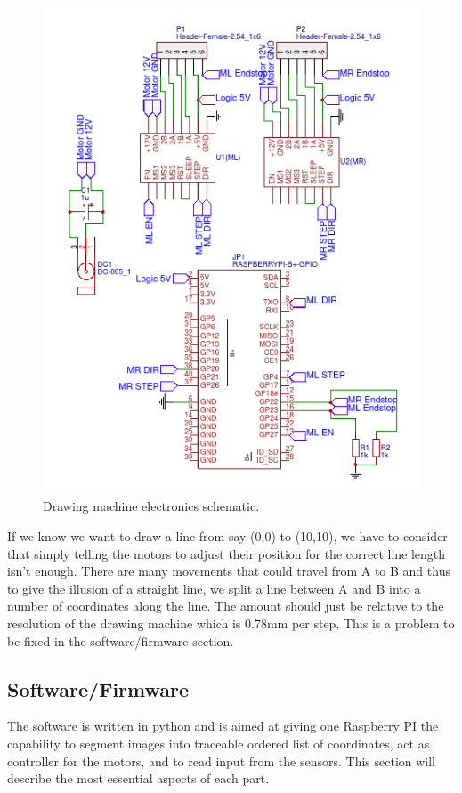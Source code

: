 \begin{figure}[h]
\centering
\includegraphics[scale=0.60]{Images/DrawingMachine/Schematic.png}
\caption{ Drawing machine electronics schematic. }
\label{DrawingMachineSchematic}
\end{figure}
 
If we know we want to draw a line from say (0,0) to (10,10), we have to consider that simply telling the motors to adjust their position for the correct line length isn't enough. There are many movements that could travel from A to B and thus to give the illusion of a straight line, we split a line between A and B into a number of coordinates along the line. The amount should just be relative to the resolution of the drawing machine which is 0.78mm per step. This is a problem to be fixed in the software/firmware section.

\subsection{Software/Firmware}
The software is written in python and is aimed at giving one Raspberry PI the capability to segment images into traceable ordered list of coordinates, act as controller for the motors, and to read input from the sensors. This section will describe the most essential aspects of each part.
\\\\

